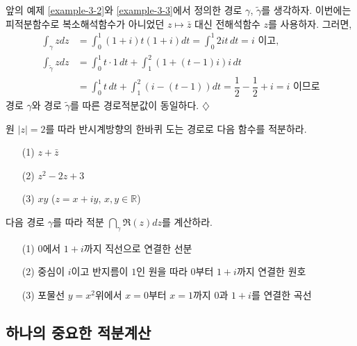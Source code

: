 \begin{salt_example} \label{example-3-4}
앞의 예제 \ref{example-3-2}와   \ref{example-3-3}에서 정의한
경로 $\gamma$, $\tilde\gamma$를 생각하자.
이번에는 피적분함수로 복소해석함수가 아니었던 $z\mapsto\bar z$ 대신 
전해석함수 $z$를 사용하자. 그러면,
\begin{align*}
\int_\gamma z dz 
&= \int_0^1 (1+i)t(1+i)dt = \int_0^1 2it\,dt = i \text{ 이고,} \\
\int_{\tilde\gamma} z dz
&= \int_0^1 t\cdot1\, dt + \int_1^2 (1+(t-1)i)i\, dt \\
&= \int_0^1 t\, dt + \int_1^2 (i-(t-1))dt
= \dfrac 12 - \dfrac12 + i = i  \text{ 이므로}
\end{align*}
경로 $\gamma$와 경로 $\tilde\gamma$를 따른  경로적분값이 동일하다.
\hfill $\diamondsuit$
\end{salt_example}

\begin{salt_exercise} \label{ex-3-3}
원 $|z|=2$를 따라 반시계방향의 한바퀴 도는 경로로 다음 함수를 적분하라.
\begin{itemize}
\item[(1)] $z+\bar z$
\item[(2)] $z^2-2z+3$
\item[(3)] $xy$ ($z=x+iy$, $x,y\in\mathbb R$)
\end{itemize}
\end{salt_exercise}


\begin{salt_exercise} \label{ex-3-4}
다음 경로 $\gamma$를 따라 적분 $\dint_\gamma \Re(z)dz$를 계산하라.
\begin{itemize}
\item[(1)] $0$에서 $1+i$까지 직선으로 연결한 선분
\item[(2)] 중심이 $i$이고 반지름이 $1$인 원을 따라 $0$부터 $1+i$까지 연결한 원호
\item[(3)] 포물선 $y=x^2$위에서 $x=0$부터 $x=1$까지 $0$과 $1+i$를 연결한 곡선
\end{itemize}
\end{salt_exercise}

\subsection{하나의 중요한 적분계산}

